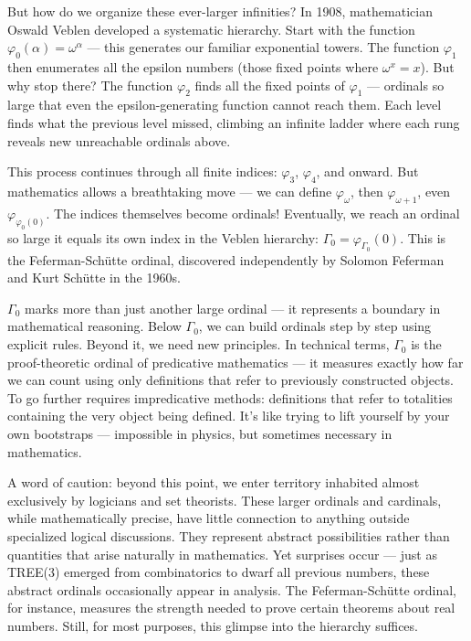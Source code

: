 But how do we organize these ever-larger infinities? In 1908, mathematician Oswald Veblen developed a systematic hierarchy. Start with the function $\varphi_0(\alpha) = \omega^\alpha$ — this generates our familiar exponential towers. The function $\varphi_1$ then enumerates all the epsilon numbers (those fixed points where $\omega^x = x$). But why stop there? The function $\varphi_2$ finds all the fixed points of $\varphi_1$ — ordinals so large that even the epsilon-generating function cannot reach them. Each level finds what the previous level missed, climbing an infinite ladder where each rung reveals new unreachable ordinals above.

This process continues through all finite indices: $\varphi_3$, $\varphi_4$, and onward. But mathematics allows a breathtaking move — we can define $\varphi_\omega$, then $\varphi_{\omega+1}$, even $\varphi_{\varphi_0(0)}$. The indices themselves become ordinals! Eventually, we reach an ordinal so large it equals its own index in the Veblen hierarchy: $\Gamma_0 = \varphi_{\Gamma_0}(0)$. This is the Feferman-Schütte ordinal, discovered independently by Solomon Feferman and Kurt Schütte in the 1960s.

$\Gamma_0$ marks more than just another large ordinal — it represents a boundary in mathematical reasoning. Below $\Gamma_0$, we can build ordinals step by step using explicit rules. Beyond it, we need new principles. In technical terms, $\Gamma_0$ is the proof-theoretic ordinal of predicative mathematics — it measures exactly how far we can count using only definitions that refer to previously constructed objects. To go further requires impredicative methods: definitions that refer to totalities containing the very object being defined. It's like trying to lift yourself by your own bootstraps — impossible in physics, but sometimes necessary in mathematics.

A word of caution: beyond this point, we enter territory inhabited almost exclusively by logicians and set theorists. These larger ordinals and cardinals, while mathematically precise, have little connection to anything outside specialized logical discussions. They represent abstract possibilities rather than quantities that arise naturally in mathematics. Yet surprises occur — just as TREE(3) emerged from combinatorics to dwarf all previous numbers, these abstract ordinals occasionally appear in analysis. The Feferman-Schütte ordinal, for instance, measures the strength needed to prove certain theorems about real numbers. Still, for most purposes, this glimpse into the hierarchy suffices.

